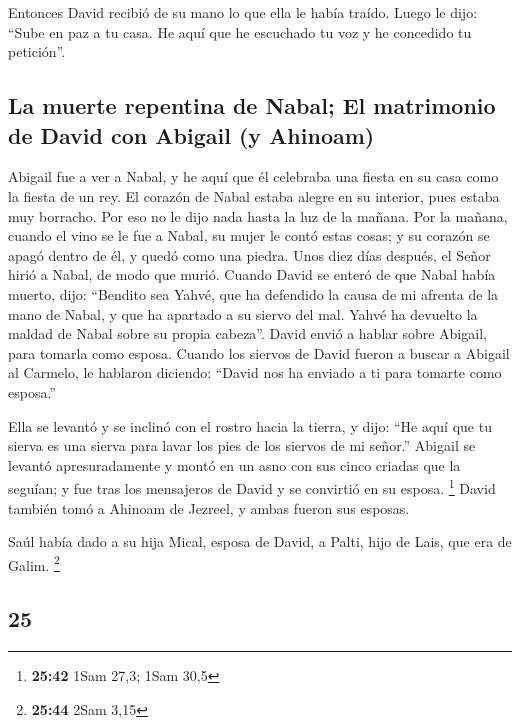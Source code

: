 \begin{paracol}{2}
 Entonces David recibió de su mano lo que ella le había
traído. Luego le dijo: ``Sube en paz a tu casa. He aquí que he escuchado
tu voz y he concedido tu petición''.

\hypertarget{la-muerte-repentina-de-nabal-el-matrimonio-de-david-con-abigail-y-ahinoam}{%
\subsection{La muerte repentina de Nabal; El matrimonio de David con
Abigail (y
Ahinoam)}\label{la-muerte-repentina-de-nabal-el-matrimonio-de-david-con-abigail-y-ahinoam}}

 Abigail fue a ver a Nabal, y he aquí que él celebraba
una fiesta en su casa como la fiesta de un rey. El corazón de Nabal
estaba alegre en su interior, pues estaba muy borracho. Por eso no le
dijo nada hasta la luz de la mañana.  Por la mañana,
cuando el vino se le fue a Nabal, su mujer le contó estas cosas; y su
corazón se apagó dentro de él, y quedó como una piedra. 
Unos diez días después, el Señor hirió a Nabal, de modo que murió.
 Cuando David se enteró de que Nabal había muerto, dijo:
``Bendito sea Yahvé, que ha defendido la causa de mi afrenta de la mano
de Nabal, y que ha apartado a su siervo del mal. Yahvé ha devuelto la
maldad de Nabal sobre su propia cabeza''. David envió a hablar sobre
Abigail, para tomarla como esposa.  Cuando los siervos de
David fueron a buscar a Abigail al Carmelo, le hablaron diciendo:
``David nos ha enviado a ti para tomarte como esposa.''

 Ella se levantó y se inclinó con el rostro hacia la
tierra, y dijo: ``He aquí que tu sierva es una sierva para lavar los
pies de los siervos de mi señor.''  Abigail se levantó
apresuradamente y montó en un asno con sus cinco criadas que la seguían;
y fue tras los mensajeros de David y se convirtió en su esposa.
\footnote{\textbf{25:42} 1Sam 27,3; 1Sam 30,5}  David
también tomó a Ahinoam de Jezreel, y ambas fueron sus esposas.

 Saúl había dado a su hija Mical, esposa de David, a
Palti, hijo de Lais, que era de Galim. \footnote{\textbf{25:44} 2Sam
  3,15}

\switchcolumn
\begin{otherlanguage}{english}

\hypertarget{section-49}{%
\section{25}\label{section-49}}


\end{otherlanguage}
\end{paracol}
